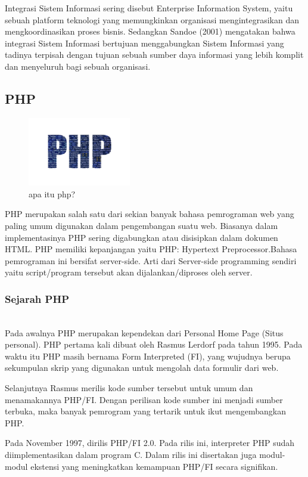 Integrasi Sistem Informasi sering disebut Enterprise Information System, yaitu sebuah platform teknologi yang memungkinkan organisasi mengintegrasikan dan mengkoordinasikan proses bisnis. Sedangkan Sandoe (2001) mengatakan bahwa integrasi Sistem Informasi bertujuan menggabungkan Sistem Informasi yang tadinya terpisah dengan tujuan sebuah sumber daya informasi yang lebih komplit dan menyeluruh bagi sebuah organisasi.

\subsection{PHP}
	\begin{figure}[H]
		\includegraphics[width=4.5cm]{figures/php2.png}
		\centering
		\caption{apa itu php?}
	\end{figure}

PHP merupakan salah satu dari sekian banyak bahasa pemrograman web yang paling umum digunakan dalam pengembangan suatu web. Biasanya dalam implementasinya PHP sering digabungkan atau disisipkan dalam dokumen HTML. PHP memiliki kepanjangan yaitu PHP: Hypertext Preprocessor.Bahasa pemrograman ini bersifat server-side. Arti dari Server-side programming sendiri yaitu script/program tersebut akan dijalankan/diproses oleh server.
\subsubsection{Sejarah PHP}
\hfill\\
Pada awalnya PHP merupakan kependekan dari Personal Home Page (Situs personal). PHP pertama kali dibuat oleh Rasmus Lerdorf pada tahun 1995. Pada waktu itu PHP masih bernama Form Interpreted (FI), yang wujudnya berupa sekumpulan skrip yang digunakan untuk mengolah data formulir dari web.

Selanjutnya Rasmus merilis kode sumber tersebut untuk umum dan menamakannya PHP/FI. Dengan perilisan kode sumber ini menjadi sumber terbuka, maka banyak pemrogram yang tertarik untuk ikut mengembangkan PHP.

Pada November 1997, dirilis PHP/FI 2.0. Pada rilis ini, interpreter PHP sudah diimplementasikan dalam program C. Dalam rilis ini disertakan juga modul-modul ekstensi yang meningkatkan kemampuan PHP/FI secara signifikan.

